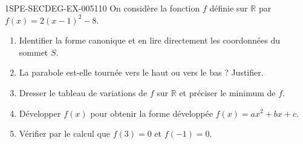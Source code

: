 \begin{exercice}{1SPE-SECDEG-EX-005}{1}{10}
On considère la fonction $f$ définie sur $\mathbb{R}$ par $f(x) = 2(x-1)^2 - 8$.

\begin{enumerate}
  \item Identifier la forme canonique et en lire directement les coordonnées du sommet $S$.
  \item La parabole est-elle tournée vers le haut ou vers le bas ? Justifier.
  \item Dresser le tableau de variations de $f$ sur $\mathbb{R}$ et préciser le minimum de $f$.
  \item Développer $f(x)$ pour obtenir la forme développée $f(x) = ax^2 + bx + c$.
  \item Vérifier par le calcul que $f(3) = 0$ et $f(-1) = 0$.
\end{enumerate}
\end{exercice}

